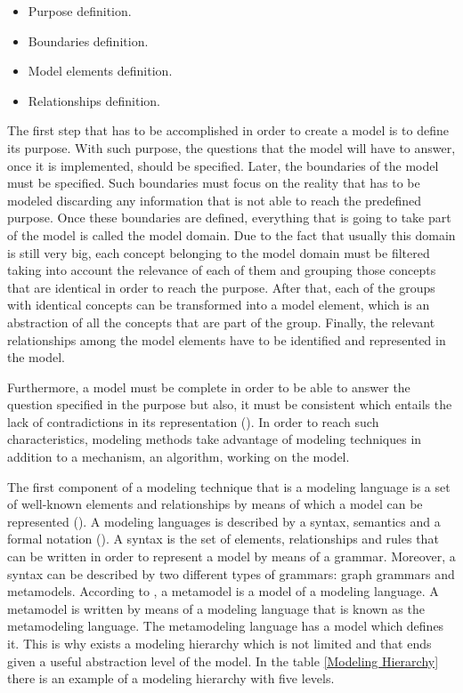 \begin{itemize}

\item Purpose definition.
\item Boundaries definition.
\item Model elements definition.
\item Relationships definition.

\end{itemize}

The first step that has to be accomplished in order to create a model is to define its purpose. With such purpose, the questions that the model will have to answer, once it is implemented, should be specified. Later, the boundaries of the model must be specified. Such boundaries must focus on the reality that has to be modeled discarding any information that is not able to reach the predefined purpose. Once these boundaries are defined, everything that is going to take part of the model is called the model domain. Due to the fact that usually this domain is still very big, each concept belonging to the model domain must be filtered taking into account the relevance of each of them and grouping those concepts that are identical in order to reach the purpose. After that, each of the groups with identical concepts can be transformed into a model element, which is an abstraction of all the concepts that are part of the group. Finally, the relevant relationships among the model elements have to be identified and represented in the model.

Furthermore, a model must be complete in order to be able to answer the question specified in the purpose but also, it must be consistent which entails the lack of contradictions in its representation (\cite{metamodelwebsite}). In order to reach such characteristics, modeling methods take advantage of modeling techniques in addition to a mechanism, an algorithm, working on the model.

The first component of a modeling technique that is a modeling language is a set of well-known elements and relationships by means of which a model can be represented (\cite{metamodelwebsite}). A modeling languages is described by a syntax, semantics and a formal notation (\cite{metamodelwebsite}). A syntax is the set of elements, relationships and rules that can be written in order to represent a model by means of a grammar. Moreover, a syntax can be described by two different types of grammars: graph grammars and metamodels. According to \cite{metamodelwebsite}, a metamodel is a model of a modeling language. A metamodel is written by means of a modeling language that is known as the metamodeling language. The metamodeling language has a model which defines it. This is why exists a modeling hierarchy which is not limited and that ends given a useful abstraction level of the model. In the table \ref{Modeling Hierarchy} there is an example of a modeling hierarchy with five levels.

